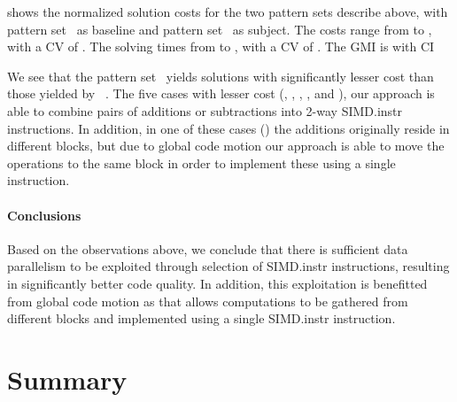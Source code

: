  shows the normalized \gls{solution}
costs for the two \glspl{pattern set} describe above, with \gls{pattern
  set}~\patternSetA{} as \gls{baseline} and \gls{pattern set}~\patternSetB{} as
\gls{subject}.
%
The costs range from
\printMinCycles{%
  \SimdVsWithoutCyclesSpeedupCyclesAvgMin,
  \SimdVsWithoutCyclesSpeedupBaselineCyclesAvgMin
} to
\printMaxCycles{%
  \SimdVsWithoutCyclesSpeedupCyclesAvgMax,
  \SimdVsWithoutCyclesSpeedupBaselineCyclesAvgMax
}, with a \gls{CV} of
\numMaxOf{
  \SimdVsWithoutCyclesSpeedupCyclesCvMax,
  \SimdVsWithoutCyclesSpeedupBaselineCyclesCvMax
}.
%
The solving times from
\printMinSolvingTime{%
  \SimdVsWithoutCyclesSpeedupPrePlusSolvingTimeAvgMin,
  \SimdVsWithoutCyclesSpeedupBaselinePrePlusSolvingTimeAvgMin
} to
\printMaxSolvingTime{%
  \SimdVsWithoutCyclesSpeedupPrePlusSolvingTimeAvgMax,
  \SimdVsWithoutCyclesSpeedupBaselinePrePlusSolvingTimeAvgMax
}, with a \gls{CV} of
\numMaxOf{
  \SimdVsWithoutCyclesSpeedupPrePlusSolvingTimeCvMax,
  \SimdVsWithoutCyclesSpeedupBaselinePrePlusSolvingTimeCvMax
}.
%
The \gls{GMI} is \printGMI{%
  \SimdVsWithoutCyclesSpeedupCyclesRegularSpeedupGmean%
} with \gls{CI}~\printGMICI{%
  \SimdVsWithoutCyclesSpeedupCyclesRegularSpeedupCiMin%
}{%
  \SimdVsWithoutCyclesSpeedupCyclesRegularSpeedupCiMax%
}

We see that the \gls{pattern set}~\patternSetB{} yields \glspl{solution} with
significantly lesser cost than those yielded by ~\patternSetA.
%
The five cases with lesser cost (,
, ,
, and ), our approach is able to combine
pairs of additions or subtractions into \num{2}-way \gls{SIMD.instr}
\glspl{instruction}.
%
In addition, in one of these cases () the additions
originally reside in different \glspl{block}, but due to \gls{global code
  motion} our approach is able to move the operations to the same block in order
to implement these using a single \gls{instruction}.
%
%


\paragraph{Conclusions}

Based on the observations above, we conclude that there is sufficient data
parallelism to be exploited through selection of \gls{SIMD.instr}
\glspl{instruction}, resulting in significantly better code quality.
%
In addition, this exploitation is benefitted from \gls{global code motion} as
that allows computations to be gathered from different \glspl{block} and
implemented using a single \gls{SIMD.instr} \gls{instruction}.


\section{Summary}

